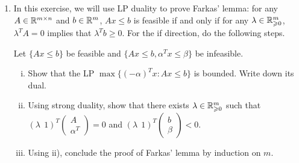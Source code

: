 \documentclass[11pt]{article}
\renewcommand{\leq}{\leqslant}
\renewcommand{\geq}{\geqslant}
\begin{document}
\begin{enumerate}[1)]
\begin{solution}
By using Gaussian elimination on this constraint combined with (2) and (3) we get:
$$−4y_2−2y_3−7y_4 =−4/3$$
$$−3y_2−5y_3−9y_4 =−1$$
and 
$$14/3y_3 + 5y_4 = 0.$$
Since $y_1, y_2, y_3, y_4 ≥0$, we have that $y_3 = y_4 = 0$ and then $y_1 = y_2 = 1/3$. This is the desired
feasible dual solution coinciding with the primal solution $(4/3, 10/3)$, proving the optimality of the
latter.

\end{solution}


\item In this exercise, we will use LP duality to prove Farkas' lemma: for any $A\in \mathbb{R}^{m\times n}$ and $b\in \mathbb{R}^m$, $Ax \leq b$ is feasible if and only if for any $\lambda \in \R^m_{\geq 0}$, $\lambda^T A = 0$ implies that $\lambda^T b \geq 0$.
For the if direction, do the following steps. 

Let $\{Ax\leq b\}$ be feasible and $\{Ax\leq b, \alpha^T x\leq \beta\}$ be infeasible.
\begin{enumerate}[i)]
	\item Show that the LP $\max\{(-\alpha)^Tx: Ax\leq b\}$ is bounded. Write down its dual.
	\item Using strong duality, show that there exists $\lambda \in \R^m_{\geq 0}$ such that $(\lambda \;\, 1)^T \begin{pmatrix} A \\ \alpha^T \end{pmatrix} = 0$ and $(\lambda \;\, 1)^T \begin{pmatrix} b \\ \beta \end{pmatrix} < 0$.
	\item Using ii), conclude the proof of Farkas' lemma by induction on $m$.
\end{enumerate}


\end{enumerate}
\end{document}
